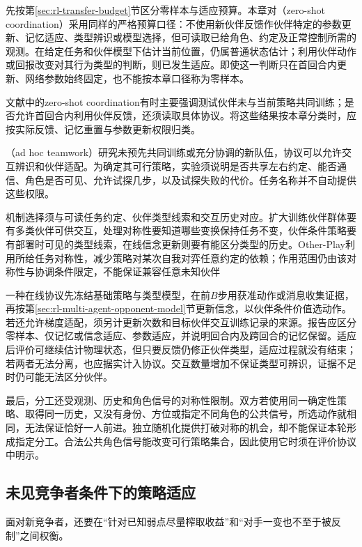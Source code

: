 先按第\ref{sec:rl-transfer-budget}节区分零样本与适应预算。本章对（zero-shot coordination）采用同样的严格预算口径：不使用新伙伴反馈作伙伴特定的参数更新、记忆适应、类型辨识或模型选择，但可读取已给角色、约定及正常控制所需的观测。在给定任务和伙伴模型下估计当前位置，仍属普通状态估计；利用伙伴动作或回报改变对其行为类型的判断，则已发生适应。即使这一判断只在首回合内更新、网络参数始终固定，也不能按本章口径称为零样本。

文献中的zero-shot coordination有时主要强调测试伙伴未与当前策略共同训练；是否允许首回合内利用伙伴反馈，还须读取具体协议。将这些结果按本章分类时，应按实际反馈、记忆重置与参数更新权限归类。

（ad hoc teamwork）研究未预先共同训练或充分协调的新队伍，协议可以允许交互辨识和伙伴适配。为确定其可行策略，实验须说明是否共享左右约定、能否通信、角色是否可见、允许试探几步，以及试探失败的代价。任务名称并不自动提供这些权限。

机制选择须与可读任务约定、伙伴类型线索和交互历史对应。扩大训练伙伴群体要有多类伙伴可供交互，处理对称性要知道哪些变换保持任务不变，伙伴条件策略要有部署时可见的类型线索，在线信念更新则要有能区分类型的历史。Other-Play利用所给任务对称性，减少策略对某次自我对弈任意约定的依赖；作用范围仍由该对称性与协调条件限定，不能保证兼容任意未知伙伴

一种在线协议先冻结基础策略与类型模型，在前$B$步用获准动作或消息收集证据，再按第\ref{sec:rl-multi-agent-opponent-model}节更新信念，以伙伴条件价值选动作。若还允许梯度适配，须另计更新次数和目标伙伴交互训练记录的来源。报告应区分零样本、仅记忆或信念适应、参数适应，并说明回合内及跨回合的记忆保留。适应后评价可继续估计物理状态，但只要反馈仍修正伙伴类型，适应过程就没有结束；若两者无法分离，也应据实计入协议。交互数量增加不保证类型可辨识，证据不足时仍可能无法区分伙伴。

最后，分工还受观测、历史和角色信号的对称性限制。双方若使用同一确定性策略、取得同一历史，又没有身份、方位或指定不同角色的公共信号，所选动作就相同，无法保证恰好一人前进。独立随机化提供打破对称的机会，却不能保证本轮形成指定分工。合法公共角色信号能改变可行策略集合，因此使用它时须在评价协议中明示。

\subsection{未见竞争者条件下的策略适应}
\label{sec:rl-multi-agent-new-opponents}

面对新竞争者，还要在“针对已知弱点尽量榨取收益”和“对手一变也不至于被反制”之间权衡。

